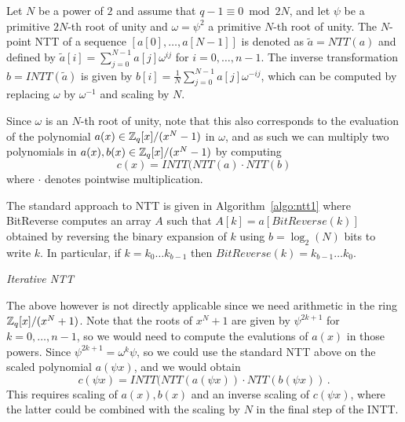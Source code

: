 Let $N$ be a power of $2$ and assume that $q-1 \equiv 0 \bmod 2N$, and let $\psi$ be a primitive $2N$-th root 
of unity and $\omega = \psi^2$ a primitive $N$-th root of unity.  The $N$-point NTT of a sequence 
$[a[0], \ldots, a[N-1]]$ is denoted as $\tilde{a} = NTT(a)$ and defined by $\tilde{a}[i] = \sum_{j = 0}^{N-1} a[j] \omega^{i j}$
for $i = 0, \ldots, n-1$.  The inverse transformation $b = INTT(\tilde{a})$ is given by 
$b[i] = \frac{1}{N} \sum_{j = 0}^{N-1} a[j] \omega^{-i j}$, which can be computed by replacing $\omega$ 
by $\omega^{-1}$ and scaling by $N$.

Since $\omega$ is an $N$-th root of unity, note that this also corresponds to the evaluation 
of the polynomial $a(x) \in \mathbb{Z}_q[x]/(x^N - 1)$ in $\omega$, and as such we can multiply two 
polynomials in $a(x), b(x) \in \mathbb{Z}_q[x]/(x^N - 1)$ by computing
\[  c(x) = INTT(NTT(a) \cdot NTT(b)  \]
where $\cdot$ denotes pointwise multiplication.

The standard approach to NTT is given in Algorithm~\ref{algo:ntt1} where BitReverse
computes an array $A$ such that $A[k] = a[BitReverse(k)]$ obtained by reversing
the binary expansion of $k$ using $b = \log_2(N)$ bits to write $k$.
In particular, if $k = k_0 \ldots k_{b-1}$ then $BitReverse(k) = k_{b-1} \ldots k_0$. 
\begin{algorithm}[!t] \label{algo:ntt1}
\begin{scriptsize}
\caption{\emph{Iterative NTT}}
\end{scriptsize}
\end{algorithm} 


The above however is not directly applicable since we need arithmetic in the ring $\mathbb{Z}_q[x]/(x^N+1)$.
Note that the roots of $x^N+1$ are given by $\psi^{2k + 1}$ for $k = 0, \ldots, n-1$, so we would 
need to compute the evalutions of $a(x)$ in those powers.  Since $\psi^{2k + 1} = \omega^k \psi$, 
so we could use the standard NTT above on the scaled polynomial $a(\psi x)$, and we would obtain
\[  c(\psi x) =    INTT(NTT(a(\psi x)) \cdot NTT(b(\psi x))   \, . \]
This requires scaling of $a(x), b(x)$ and an inverse scaling of $c(\psi x)$, where the latter could be 
combined with the scaling by $N$ in the final step of the INTT.

